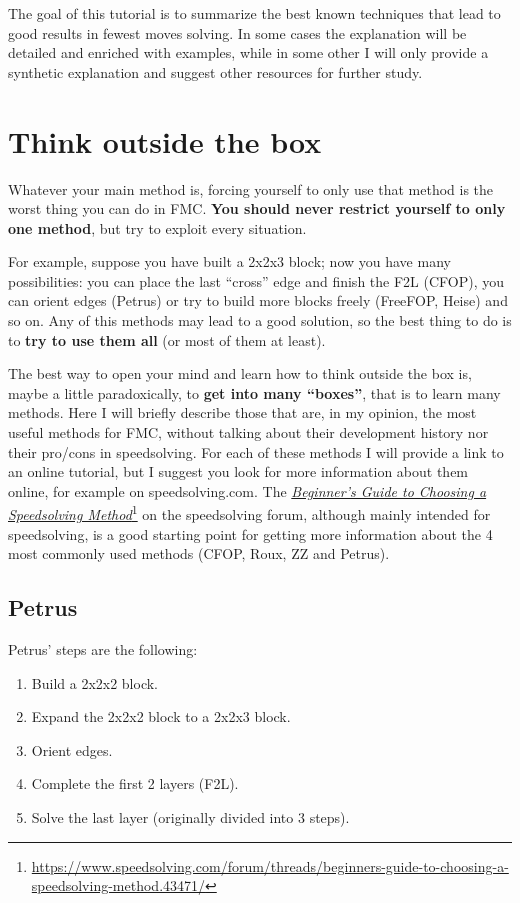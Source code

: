 \documentclass[11pt,a4paper]{book}
\begin{document}
The goal of this tutorial is to summarize the best known techniques that lead to good results in fewest moves solving. In some cases the explanation will be detailed and enriched with examples, while in some other I will only provide a synthetic explanation and suggest other resources for further study.

\chapter{Think outside the box}

Whatever your main method is, forcing yourself to only use that method is the worst thing you can do in FMC. \textbf{You should never restrict yourself to only one method}, but try to exploit every situation.

For example, suppose you have built a 2x2x3 block; now you have many possibilities: you can place the last ``cross'' edge and finish the F2L (CFOP), you can orient edges (Petrus) or try to build more blocks freely (FreeFOP, Heise) and so on. Any of this methods may lead to a good solution, so the best thing to do is to \textbf{try to use them all} (or most of them at least).

The best way to open your mind and learn how to think outside the box is, maybe a little paradoxically, to \textbf{get into many ``boxes''}, that is to learn many methods. Here I will briefly describe those that are, in my opinion, the most useful methods for FMC, without talking about their development history nor their pro/cons in speedsolving. For each of these methods I will provide a link to an online tutorial, but I suggest you look for more information about them online, for example on speedsolving.com. The
\href{https://www.speedsolving.com/forum/threads/beginners-guide-to-choosing-a-speedsolving-method.43471/}{\emph{Beginner's Guide to Choosing a Speedsolving Method}}\footnote{\url{https://www.speedsolving.com/forum/threads/beginners-guide-to-choosing-a-speedsolving-method.43471/}} on the speedsolving forum, although mainly intended for speedsolving, is a good starting point for getting more information about the 4 most commonly used methods (CFOP, Roux, ZZ and Petrus).

\section{Petrus}

Petrus' steps are the following:
\begin{enumerate}
\item Build a 2x2x2 block.
\item Expand the 2x2x2 block to a 2x2x3 block.
\item Orient edges.
\item Complete the first 2 layers (F2L).
\item Solve the last layer (originally divided into 3 steps).
\end{enumerate}
\end{document}
